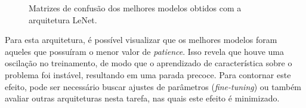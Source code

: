 \begin{figure}[H]
	\centering
	\caption{Matrizes de confusão dos melhores modelos obtidos com a arquitetura LeNet.}\label{fig:matrizes-lenet}
	\hfill
\end{figure}


Para esta arquitetura, é possível visualizar que os melhores modelos foram aqueles que possuíram o menor valor de \emph{patience}. Isso revela que houve uma oscilação no treinamento, de modo que o aprendizado de característica sobre o problema foi instável, resultando em uma parada precoce. Para contornar este efeito, pode ser necessário buscar ajustes de parâmetros (\emph{fine-tuning}) ou também avaliar outras arquiteturas nesta tarefa, nas quais este efeito é minimizado.

